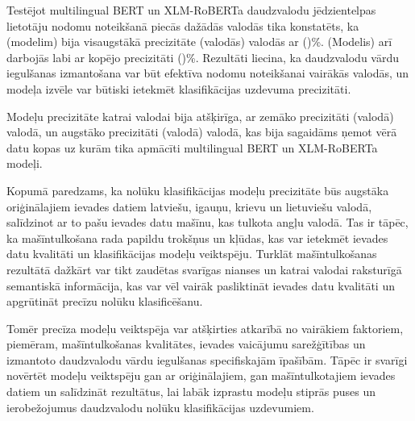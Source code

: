
Testējot multilingual BERT un XLM-RoBERTa daudzvalodu jēdzientelpas lietotāju nodomu noteikšanā piecās dažādās valodās tika konstatēts, ka (modelim) bija visaugstākā precizitāte (valodās) valodās ar ()\%. (Modelis) arī darbojās labi ar kopējo precizitāti ()\%. Rezultāti liecina, ka daudzvalodu vārdu iegulšanas izmantošana var būt efektīva nodomu noteikšanai vairākās valodās, un modeļa izvēle var būtiski ietekmēt klasifikācijas uzdevuma precizitāti.

Modeļu precizitāte katrai valodai bija atšķirīga, ar zemāko precizitāti (valodā) valodā, un augstāko precizitāti (valodā) valodā, kas bija sagaidāms ņemot vērā datu kopas uz kurām tika apmācīti multilingual BERT un XLM-RoBERTa modeļi. 


Kopumā paredzams, ka nolūku klasifikācijas modeļu precizitāte būs augstāka oriģinālajiem ievades datiem latviešu, igauņu, krievu un lietuviešu valodā, salīdzinot ar to pašu ievades datu mašīnu, kas tulkota angļu valodā. Tas ir tāpēc, ka mašīntulkošana rada papildu trokšņus un kļūdas, kas var ietekmēt ievades datu kvalitāti un klasifikācijas modeļu veiktspēju. Turklāt mašīntulkošanas rezultātā dažkārt var tikt zaudētas svarīgas nianses un katrai valodai raksturīgā semantiskā informācija, kas var vēl vairāk pasliktināt ievades datu kvalitāti un apgrūtināt precīzu nolūku klasificēšanu.

Tomēr precīza modeļu veiktspēja var atšķirties atkarībā no vairākiem faktoriem, piemēram, mašīntulkošanas kvalitātes, ievades vaicājumu sarežģītības un izmantoto daudzvalodu vārdu iegulšanas specifiskajām īpašībām. Tāpēc ir svarīgi novērtēt modeļu veiktspēju gan ar oriģinālajiem, gan mašīntulkotajiem ievades datiem un salīdzināt rezultātus, lai labāk izprastu modeļu stiprās puses un ierobežojumus daudzvalodu nolūku klasifikācijas uzdevumiem.






